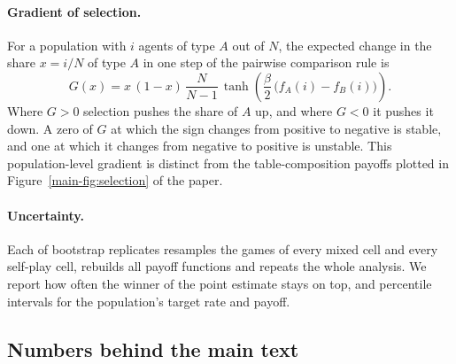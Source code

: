 \documentclass[10pt]{article}
\let\plainsubsection\subsection
\renewcommand{\subsection}{\FloatBarrier\needspace{8\baselineskip}\plainsubsection}
\begin{document}
\paragraph{Gradient of selection.} For a population with $i$ agents of type $A$ out of $N$, the expected change in the share $x=i/N$ of type $A$ in one step of the pairwise comparison rule is
\[
G(x)=x\,(1-x)\,\frac{N}{N-1}\,\tanh\!\left(\frac{\beta}{2}\,\bigl(f_A(i)-f_B(i)\bigr)\right).
\]
Where $G>0$ selection pushes the share of $A$ up, and where $G<0$ it pushes it down. A zero of $G$ at which the sign changes from positive to negative is stable, and one at which it changes from negative to positive is unstable. This population-level gradient is distinct from the table-composition payoffs plotted in Figure~\ref{main-fig:selection} of the paper.

\paragraph{Uncertainty.} Each of \SupSelBootReps{} bootstrap replicates resamples the games of every mixed cell and every self-play cell, rebuilds all payoff functions and repeats the whole analysis. We report how often the winner of the point estimate stays on top, and percentile intervals for the population's target rate and payoff.

\subsection{Numbers behind the main text}
\end{document}
